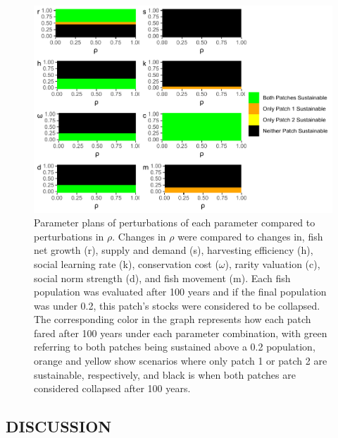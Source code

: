 \documentclass[
]{article}
\begin{document}
\begin{figure}
\centering
\includegraphics{Wulfing_Thesis_files/figure-latex/rhoParamPlane-1.pdf}
\caption{\label{fig:rhoParamPlane}Parameter plans of perturbations of each parameter compared to perturbations in \(\rho\). Changes in \(\rho\) were compared to changes in, fish net growth (r), supply and demand (s), harvesting efficiency (h), social learning rate (k), conservation cost (\(\omega\)), rarity valuation (c), social norm strength (d), and fish movement (m). Each fish population was evaluated after 100 years and if the final population was under 0.2, this patch's stocks were considered to be collapsed. The corresponding color in the graph represents how each patch fared after 100 years under each parameter combination, with green referring to both patches being sustained above a 0.2 population, orange and yellow show scenarios where only patch 1 or patch 2 are sustainable, respectively, and black is when both patches are considered collapsed after 100 years. \label{rhoParamPlane}}
\end{figure}

\hypertarget{discussion-1}{%
\subsection{DISCUSSION}\label{discussion-1}}
\end{document}
